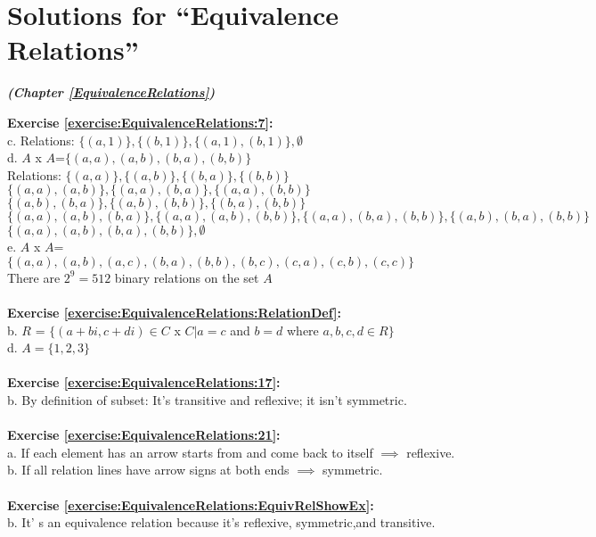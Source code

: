 \section{Solutions for  ``Equivalence Relations''}
\noindent\textbf{\textit{ (Chapter \ref{EquivalenceRelations})}}\bigskip

\noindent\textbf{Exercise \ref{exercise:EquivalenceRelations:7}:}\\
c. Relations: $\{(a,1)\},\{(b,1)\},\{(a,1),(b,1)\},\emptyset$\\
d. $A$ x $A$=$\{(a,a),(a,b),(b,a),(b,b)\}$\\
Relations: $\{(a,a)\},\{(a,b)\}, \{(b,a)\}, \{(b,b)\}$\\
$\{(a,a),(a,b)\}, \{(a,a),(b,a)\}, \{(a,a),(b,b)\}$\\
$\{(a,b),(b,a)\}, \{(a,b),(b,b)\}, \{(b,a),(b,b)\}$\\
$\{(a,a),(a,b),(b,a)\}, \{(a,a),(a,b),(b,b)\}, \{(a,a),(b,a),(b,b)\}, \{(a,b),(b,a),(b,b)\}$\\
$\{(a,a),(a,b),(b,a),(b,b)\},\emptyset$\\
e. $A$ x $A$=$\{(a,a),(a,b),(a,c),(b,a),(b,b),(b,c),(c,a),(c,b),(c,c)\}$\\
There are $2^9=512$ binary relations on the set $A$\\
\\
\textbf{Exercise \ref{exercise:EquivalenceRelations:RelationDef}:}\\
b. $R$ = $\{(a+bi,c+di)\in C$ x $C | a=c$ and $b=d$ where $a,b,c,d\in R\}$\\
d. $A=\{1,2,3\}$\\
\\
\textbf{Exercise \ref{exercise:EquivalenceRelations:17}:}\\
b. By definition of subset: It's transitive and reflexive; it isn't symmetric.\\
\\
\textbf{Exercise \ref{exercise:EquivalenceRelations:21}:}\\
a. If each element has an arrow starts from and come back to itself $\implies$  reflexive.\\
b. If all relation lines have arrow signs at both ends $\implies$  symmetric.\\
\\
\textbf{Exercise \ref{exercise:EquivalenceRelations:EquivRelShowEx}:}\\
b. It' s an equivalence relation because it's reflexive, symmetric,and transitive.\\
